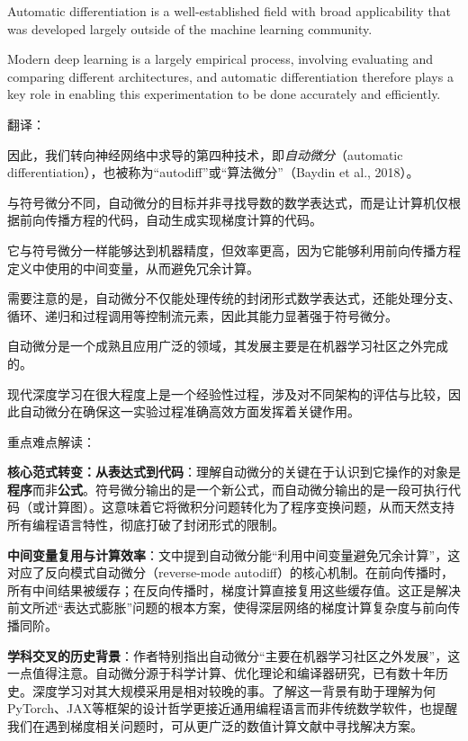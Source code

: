 \documentclass{article}
\begin{document}
Automatic differentiation is a well-established field with broad applicability that was developed largely outside of the machine learning community. 

Modern deep learning is a largely empirical process, involving evaluating and comparing different architectures, and automatic differentiation therefore plays a key role in enabling this experimentation to be done accurately and efficiently.

{\color{red}
翻译：

因此，我们转向神经网络中求导的第四种技术，即\textit{自动微分}（automatic differentiation），也被称为“autodiff”或“算法微分”（Baydin et al., 2018）。

与符号微分不同，自动微分的目标并非寻找导数的数学表达式，而是让计算机仅根据前向传播方程的代码，自动生成实现梯度计算的代码。

它与符号微分一样能够达到机器精度，但效率更高，因为它能够利用前向传播方程定义中使用的中间变量，从而避免冗余计算。

需要注意的是，自动微分不仅能处理传统的封闭形式数学表达式，还能处理分支、循环、递归和过程调用等控制流元素，因此其能力显著强于符号微分。

自动微分是一个成熟且应用广泛的领域，其发展主要是在机器学习社区之外完成的。

现代深度学习在很大程度上是一个经验性过程，涉及对不同架构的评估与比较，因此自动微分在确保这一实验过程准确高效方面发挥着关键作用。
}

{\color{blue}
重点难点解读：

\textbf{核心范式转变：从表达式到代码}：理解自动微分的关键在于认识到它操作的对象是\textbf{程序}而非\textbf{公式}。符号微分输出的是一个新公式，而自动微分输出的是一段可执行代码（或计算图）。这意味着它将微积分问题转化为了程序变换问题，从而天然支持所有编程语言特性，彻底打破了封闭形式的限制。

\textbf{中间变量复用与计算效率}：文中提到自动微分能“利用中间变量避免冗余计算”，这对应了反向模式自动微分（reverse-mode autodiff）的核心机制。在前向传播时，所有中间结果被缓存；在反向传播时，梯度计算直接复用这些缓存值。这正是解决前文所述“表达式膨胀”问题的根本方案，使得深层网络的梯度计算复杂度与前向传播同阶。

\textbf{学科交叉的历史背景}：作者特别指出自动微分“主要在机器学习社区之外发展”，这一点值得注意。自动微分源于科学计算、优化理论和编译器研究，已有数十年历史。深度学习对其大规模采用是相对较晚的事。了解这一背景有助于理解为何PyTorch、JAX等框架的设计哲学更接近通用编程语言而非传统数学软件，也提醒我们在遇到梯度相关问题时，可从更广泛的数值计算文献中寻找解决方案。

}
\end{document}
